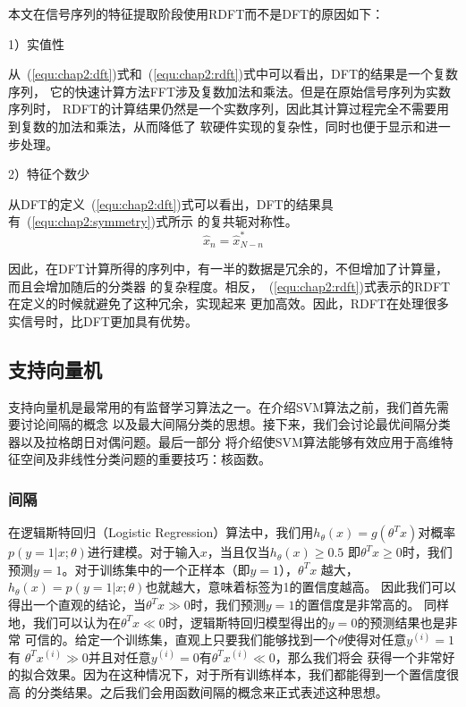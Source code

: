 本文在信号序列的特征提取阶段使用RDFT而不是DFT的原因如下：

1）实值性

从~(\ref{equ:chap2:dft})式和~(\ref{equ:chap2:rdft})式中可以看出，DFT的结果是一个复数序列，
它的快速计算方法FFT涉及复数加法和乘法。但是在原始信号序列为实数序列时，
RDFT的计算结果仍然是一个实数序列，因此其计算过程完全不需要用到复数的加法和乘法，从而降低了
软硬件实现的复杂性，同时也便于显示和进一步处理。

2）特征个数少

从DFT的定义~(\ref{equ:chap2:dft})式可以看出，DFT的结果具有~(\ref{equ:chap2:symmetry})式所示
的复共轭对称性。
\begin{equation}
\label{equ:chap2:symmetry}
  \hat{x}_n = \hat{x}^*_{N-n}
\end{equation}

因此，在DFT计算所得的序列中，有一半的数据是冗余的，不但增加了计算量，而且会增加随后的分类器
的复杂程度。相反，~(\ref{equ:chap2:rdft})式表示的RDFT在定义的时候就避免了这种冗余，实现起来
更加高效。因此，RDFT在处理很多实信号时，比DFT更加具有优势。

\subsection{支持向量机}

支持向量机是最常用的有监督学习算法之一。在介绍SVM算法之前，我们首先需要讨论间隔的概念
以及最大间隔分类的思想。接下来，我们会讨论最优间隔分类器以及拉格朗日对偶问题。最后一部分
将介绍使SVM算法能够有效应用于高维特征空间及非线性分类问题的重要技巧：核函数。

\subsubsection{间隔}

在逻辑斯特回归（Logistic Regression）算法中，我们用$h_{\theta}(x) = g(\theta^Tx)$对概率
$p(y = 1|x;\theta)$进行建模。对于输入$x$，当且仅当$h_{\theta}(x) \geq 0.5$
即$\theta^Tx \geq 0$时，我们预测$y = 1$。对于训练集中的一个正样本（即$y = 1$），$\theta^Tx$
越大，$h_{\theta}(x) = p(y = 1|x;\theta)$也就越大，意味着标签为1的置信度越高。
因此我们可以得出一个直观的结论，当$\theta^Tx \gg 0$时，我们预测$y = 1$的置信度是非常高的。
同样地，我们可以认为在$\theta^Tx \ll 0$时，逻辑斯特回归模型得出的$y = 0$的预测结果也是非常
可信的。给定一个训练集，直观上只要我们能够找到一个$\theta$使得对任意$y^{(i)} = 1$有
$\theta^Tx^{(i)} \gg 0$并且对任意$y^{(i)} = 0$有$\theta^Tx^{(i)} \ll 0$，那么我们将会
获得一个非常好的拟合效果。因为在这种情况下，对于所有训练样本，我们都能得到一个置信度很高
的分类结果。之后我们会用函数间隔的概念来正式表述这种思想。

